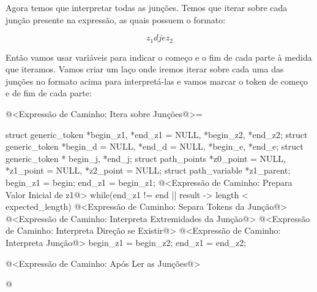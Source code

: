 Agora temos que interpretar todas as junções. Temos que iterar sobre
cada junção presente na expressão, as quais possuem o formato:

$$
z_1{d} j {e}z_2
$$

Então vamos usar variáveis para indicar o começo e o fim de cada parte
à medida que iteramos. Vamos criar um laço onde iremos iterar sobre
cada uma das junções no formato acima para interpretá-las e vamos
marcar o token de começo e de fim de cada parte:

\iniciocodigo
@<Expressão de Caminho: Itera sobre Junções@>=
{
  struct generic_token *begin_z1, *end_z1 = NULL, *begin_z2, *end_z2;
  struct generic_token *begin_d = NULL, *end_d = NULL, *begin_e, *end_e;
  struct generic_token * begin_j, *end_j;
  struct path_points *z0_point = NULL, *z1_point = NULL, *z2_point = NULL;
  struct path_variable *z1_parent;
  begin_z1 = begin;
  end_z1 = begin_z1;
  @<Expressão de Caminho: Prepara Valor Inicial de z1@>
  while(end_z1 != end || result -> length < expected_length){
    @<Expressão de Caminho: Separa Tokens da Junção@>
    @<Expressão de Caminho: Interpreta Extremidades da Junção@>
    @<Expressão de Caminho: Interpreta Direção se Existir@>
    @<Expressão de Caminho: Interpreta Junção@>
    begin_z1 = begin_z2;
    end_z1 = end_z2;
  }

  @<Expressão de Caminho: Após Ler as Junções@>
}
@
\fimcodigo

